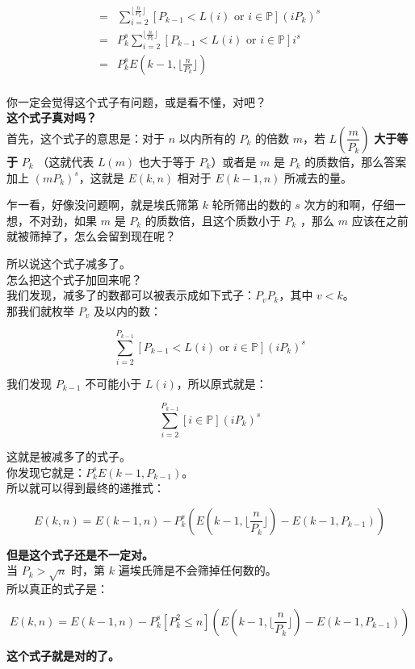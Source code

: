 \documentclass[
]{article}
\begin{document}
$$
\begin{aligned}
=&\sum_{i=2}^{\lfloor\frac{n}{P_k}\rfloor} [P_{k-1}<L(i) \,\,\text{or}\,\, i\in\mathbb{P}](iP_k)^s\\
=&P_k^s\sum_{i=2}^{\lfloor\frac{n}{P_k}\rfloor} [P_{k-1}<L(i) \,\,\text{or}\,\, i\in\mathbb{P}]i^s\\
=&P_k^sE(k-1,\lfloor\frac{n}{P_k}\rfloor)\\
\end{aligned}
$$

你一定会觉得这个式子有问题，或是看不懂，对吧？\\
\textbf{这个式子真对吗？}\\
首先，这个式子的意思是：对于 \(n\) 以内所有的 \(P_k\) 的倍数 \(m\)，若
\(L(\dfrac{m}{P_k})\) \textbf{大于等于} \(P_k\) （这就代表 \(L(m)\)
也大于等于 \(P_k\)）或者是 \(m\) 是 \(P_k\) 的质数倍，那么答案加上
\((mP_k)^s\)，这就是 \(E(k,n)\) 相对于 \(E(k-1,n)\) 所减去的量。

乍一看，好像没问题啊，就是埃氏筛第 \(k\) 轮所筛出的数的 \(s\)
次方的和啊，仔细一想，不对劲，如果 \(m\) 是 \(P_k\)
的质数倍，且这个质数小于 \(P_k\) ，那么 \(m\)
应该在之前就被筛掉了，怎么会留到现在呢？

所以说这个式子减多了。\\
怎么把这个式子加回来呢？\\
我们发现，减多了的数都可以被表示成如下式子：\(P_vP_k\)，其中 \(v<k\)。\\
那我们就枚举 \(P_v\) 及以内的数：

\[\sum_{i=2}^{P_{k-1}}[P_{k-1}<L(i)\,\,\text{or}\,\,i\in\mathbb{P}](iP_k)^s\]

我们发现 \(P_{k-1}\) 不可能小于 \(L(i)\)，所以原式就是：

\[\sum_{i=2}^{P_{k-1}}[i\in\mathbb{P}](iP_k)^s\]

这就是被减多了的式子。\\
你发现它就是：\(P_k^sE(k-1,P_{k-1})\)。\\
所以就可以得到最终的递推式：

\[E(k,n)=E(k-1,n)-P_k^s(E(k-1,\lfloor\frac{n}{P_k}\rfloor)-E(k-1,P_{k-1}))\]

\textbf{但是这个式子还是不一定对。}\\
当 \(P_k>\sqrt{n}\) 时，第 \(k\) 遍埃氏筛是不会筛掉任何数的。\\
所以真正的式子是：

\[E(k,n)=E(k-1,n)-P_k^s[P_k^2\le n](E(k-1,\lfloor\frac{n}{P_k}\rfloor)-E(k-1,P_{k-1}))\]

\textbf{这个式子就是对的了。}
\end{document}
